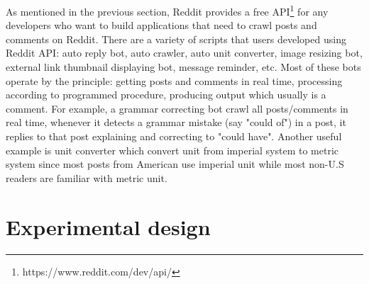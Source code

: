 As mentioned in the previous section, Reddit provides a free API\footnote{https://www.reddit.com/dev/api/} for any developers who want to build applications that need to crawl posts and comments on Reddit. There are a variety of scripts that users developed using Reddit API: auto reply bot, auto crawler, auto unit converter, image resizing bot, external link thumbnail displaying bot, message reminder, etc. Most of these bots operate by the principle: getting posts and comments in real time, processing according to programmed procedure, producing output which usually is a comment. For example, a grammar correcting bot crawl all posts/comments in real time, whenever it detects a grammar mistake (say "could of") in a post, it replies to that post explaining and correcting to "could have". Another useful example is unit converter which convert unit from imperial system to metric system since most posts from American use imperial unit while most non-U.S readers are familiar with metric unit.\\
\section{Experimental design}
